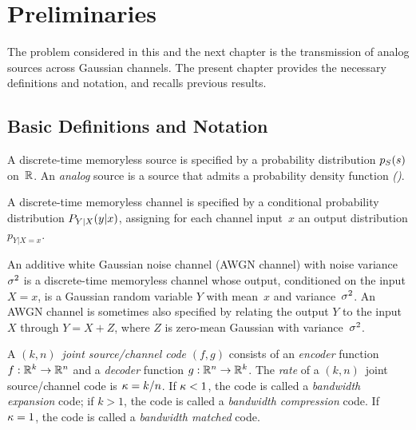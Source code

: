 \chapter{Preliminaries}
\label{ch:prelim}

The problem considered in this and the next chapter is the transmission of
analog sources across Gaussian channels. The present chapter provides the
necessary definitions and notation, and recalls previous results.

\section{Basic Definitions and Notation}
\label{sec:defs}

\begin{definition}[Source]
  \label{def:analogsource}
  A discrete-time memoryless source is specified by a probability distribution
  ${p_S}(s)$ on~$\mathbb{R}$. An \emph{analog} source is a source that admits a
  probability density function \emph{(\pdf)}.
\end{definition}

\begin{definition}[Channel]
  \label{def:dtmlc}
  A discrete-time memoryless channel is specified by a conditional probability
  distribution $P_{Y|X}(y|x)$, assigning for each channel input~$x$ an output
  distribution $p_{Y|X=x}$. 
\end{definition}

\begin{definition}
  \label{def:awgn}
  An additive white Gaussian noise channel (AWGN channel) with noise
  variance~${\sigma^2}$ is a discrete-time memoryless channel whose output, conditioned
  on the input $X=x$, is a Gaussian random variable $Y$ with mean~$x$ and
  variance~${\sigma^2}$. An AWGN channel is sometimes also specified by relating the
  output $Y$ to the input $X$ through $Y = X + Z$, where $Z$ is zero-mean
  Gaussian with variance~${\sigma^2}$. 
\end{definition}

\begin{definition}
  \label{def:knsccode}
  A $(k,n)$~\emph{joint source/channel code} $(f,g)$ consists of an
  \emph{encoder} function $f : \mathbb{R}^k \rightarrow \mathbb{R}^n$ and a \emph{decoder}
  function $g:\mathbb{R}^n \rightarrow \mathbb{R}^k$. The \emph{rate} of a $(k,n)$~joint
  source/channel code is $\kappa = k/n$. If $\kappa < 1$, the code is called
  a \emph{bandwidth expansion} code; if $k > 1$, the code is called a
  \emph{bandwidth compression} code. If $\kappa = 1$, the code is called a
  \emph{bandwidth matched} code.
\end{definition}

